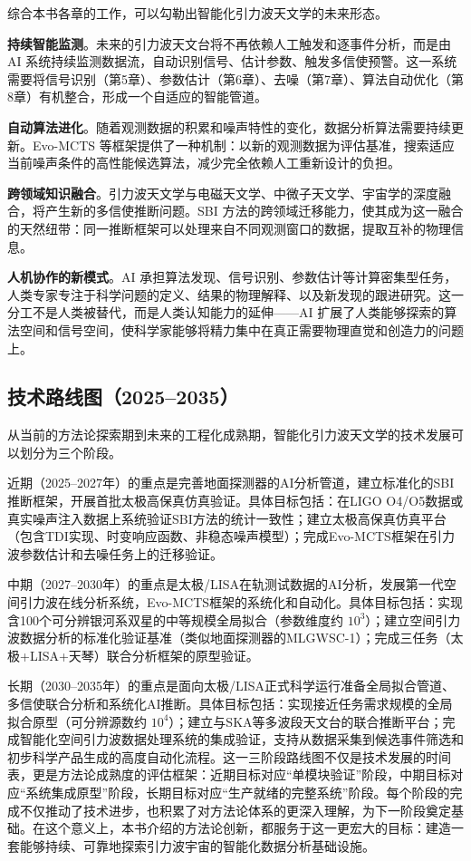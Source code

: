 综合本书各章的工作，可以勾勒出智能化引力波天文学的未来形态。

\textbf{持续智能监测}。未来的引力波天文台将不再依赖人工触发和逐事件分析，而是由 AI 系统持续监测数据流，自动识别信号、估计参数、触发多信使预警。这一系统需要将信号识别（第5章）、参数估计（第6章）、去噪（第7章）、算法自动优化（第8章）有机整合，形成一个自适应的智能管道。

\textbf{自动算法进化}。随着观测数据的积累和噪声特性的变化，数据分析算法需要持续更新。Evo-MCTS 等框架提供了一种机制：以新的观测数据为评估基准，搜索适应当前噪声条件的高性能候选算法，减少完全依赖人工重新设计的负担。

\textbf{跨领域知识融合}。引力波天文学与电磁天文学、中微子天文学、宇宙学的深度融合，将产生新的多信使推断问题。SBI 方法的跨领域迁移能力，使其成为这一融合的天然纽带：同一推断框架可以处理来自不同观测窗口的数据，提取互补的物理信息。

\textbf{人机协作的新模式}。AI 承担算法发现、信号识别、参数估计等计算密集型任务，人类专家专注于科学问题的定义、结果的物理解释、以及新发现的跟进研究。这一分工不是人类被替代，而是人类认知能力的延伸——AI 扩展了人类能够探索的算法空间和信号空间，使科学家能够将精力集中在真正需要物理直觉和创造力的问题上。

\subsection{技术路线图（2025--2035）}

从当前的方法论探索期到未来的工程化成熟期，智能化引力波天文学的技术发展可以划分为三个阶段。

近期（2025--2027年）的重点是完善地面探测器的AI分析管道，建立标准化的SBI推断框架，开展首批太极高保真仿真验证。具体目标包括：在LIGO O4/O5数据或真实噪声注入数据上系统验证SBI方法的统计一致性；建立太极高保真仿真平台（包含TDI实现、时变响应函数、非稳态噪声模型）；完成Evo-MCTS框架在引力波参数估计和去噪任务上的迁移验证。

中期（2027--2030年）的重点是太极/LISA在轨测试数据的AI分析，发展第一代空间引力波在线分析系统，Evo-MCTS框架的系统化和自动化。具体目标包括：实现含100个可分辨银河系双星的中等规模全局拟合（参数维度约 $10^3$）；建立空间引力波数据分析的标准化验证基准（类似地面探测器的MLGWSC-1）；完成三任务（太极+LISA+天琴）联合分析框架的原型验证。

长期（2030--2035年）的重点是面向太极/LISA正式科学运行准备全局拟合管道、多信使联合分析和系统化AI推断。具体目标包括：实现接近任务需求规模的全局拟合原型（可分辨源数约 $10^4$）；建立与SKA等多波段天文台的联合推断平台；完成智能化空间引力波数据处理系统的集成验证，支持从数据采集到候选事件筛选和初步科学产品生成的高度自动化流程。这一三阶段路线图不仅是技术发展的时间表，更是方法论成熟度的评估框架：近期目标对应“单模块验证”阶段，中期目标对应“系统集成原型”阶段，长期目标对应“生产就绪的完整系统”阶段。每个阶段的完成不仅推动了技术进步，也积累了对方法论体系的更深入理解，为下一阶段奠定基础。在这个意义上，本书介绍的方法论创新，都服务于这一更宏大的目标：建造一套能够持续、可靠地探索引力波宇宙的智能化数据分析基础设施。

